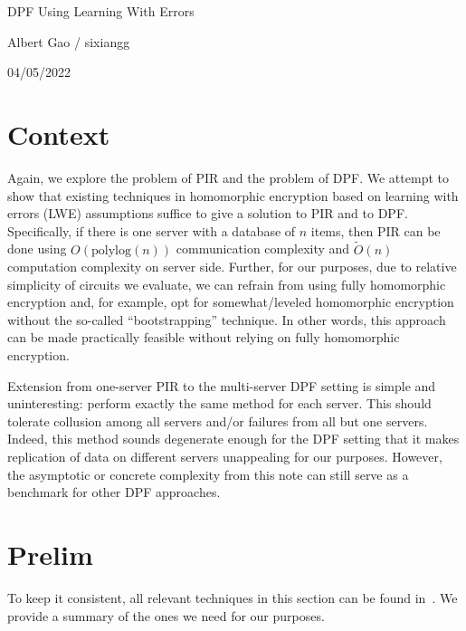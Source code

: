 \documentclass[11pt]{article}
\newcommand{\myinfo}{Albert Gao / sixiangg}
\newcommand{\currdate}{04/05/2022}
\begin{document}
\bigskip                        %

\thispagestyle{plain}
\begin{center}                  %
{\Huge DPF Using Learning With Errors}

\vspace{0.3cm}

\large{\myinfo}

\large{\currdate}

\end{center}

\section{Context}
Again, we explore the problem of PIR and the problem of DPF. We attempt to show that existing techniques in homomorphic encryption based on learning with errors (LWE) assumptions suffice to give a solution to PIR and to DPF. Specifically, if there is one server with a database of $n$ items, then PIR can be done using $O(\text{polylog}(n))$ communication complexity and $\widetilde{O}(n)$ computation complexity on server side. Further, for our purposes, due to relative simplicity of circuits we evaluate, we can refrain from using fully homomorphic encryption and, for example, opt for somewhat/leveled homomorphic encryption without the so-called ``bootstrapping'' technique. In other words, this approach can be made practically feasible without relying on fully homomorphic encryption. 

Extension from one-server PIR to the multi-server DPF setting is simple and uninteresting: perform exactly the same method for each server. This should tolerate collusion among all servers and/or failures from all but one servers. Indeed, this method sounds degenerate enough for the DPF setting that it makes replication of data on different servers unappealing for our purposes. However, 
the asymptotic or concrete complexity from this note can still serve as a benchmark for other DPF approaches.

\section{Prelim}
To keep it consistent, all relevant techniques in this section can be found in~\cite{halevi17}. We provide a summary of the ones we need for our purposes.
\end{document}
